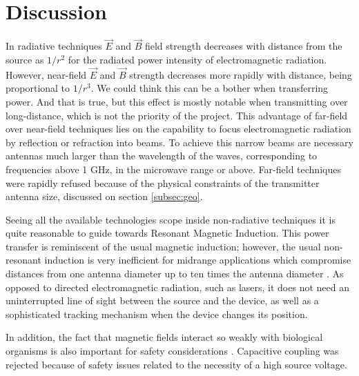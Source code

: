 
\section{Discussion}\label{sec:discussion}


In radiative techniques $\vec{E}$ and $\vec{B}$ field strength decreases with distance from the source as $1/r^2$ for the radiated power intensity of electromagnetic radiation. However, near-field $\vec{E}$ and $\vec{B}$ strength decreases more rapidly with distance, being proportional to $1/r^3$. We could think this can be a bother when transferring power. And that is true, but this effect is mostly notable when transmitting over long-distance, which is not the priority of the project. This advantage of far-field over near-field techniques lies on the capability to focus electromagnetic radiation by reflection or refraction into beams. To achieve this narrow beams are necessary antennas much larger than the wavelength of the waves, corresponding to frequencies above 1 GHz, in the microwave range or above. Far-field techniques were rapidly refused because of the physical constraints of the transmitter antenna size, discussed on section \ref{subsec:geo}.

Seeing all the available technologies scope inside non-radiative techniques it is quite reasonable to guide towards Resonant Magnetic Induction. This power transfer is reminiscent of the usual magnetic induction; however, the usual non-resonant induction is very inefficient for midrange applications which compromise distances from one antenna diameter up to ten times the antenna diameter \cite{Karalis200834}. %
As opposed to directed electromagnetic radiation, such as lasers, it does not need an uninterrupted line of sight between the source and the device, as well as a sophisticated tracking mechanism when the device changes its position.

In addition, the fact that magnetic fields interact so weakly with biological organisms is also important for safety considerations \cite{TechTalk}. Capacitive coupling was rejected because of safety issues related to the necessity of a high source voltage. 

